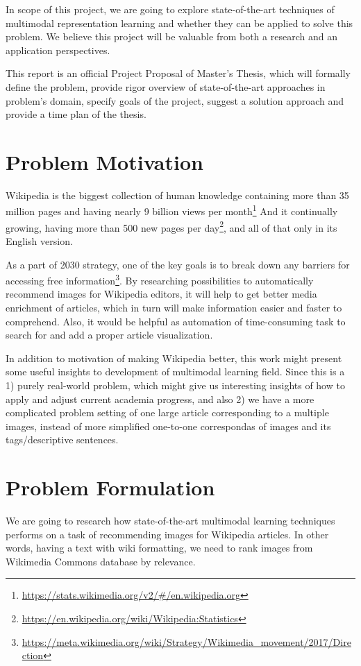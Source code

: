 \documentclass[runningheads]{llncs}
\begin{document}
In scope of this project, we are going to explore state-of-the-art techniques of multimodal representation learning and whether they can be applied to solve this problem. We believe this project will be valuable from both a research and an application perspectives.

This report is an official Project Proposal of Master's Thesis, which will formally define the problem, provide rigor overview of state-of-the-art approaches in problem's domain, specify goals of the project, suggest a solution approach and provide a time plan of the thesis.


\section{Problem Motivation}
Wikipedia is the biggest collection of human knowledge containing more than 35 million pages and having nearly 9 billion views per month\footnote{\url{https://stats.wikimedia.org/v2/#/en.wikipedia.org}} And it continually growing, having more than 500 new pages per day\footnote{\url{https://en.wikipedia.org/wiki/Wikipedia:Statistics}}, and all of that only in its English version.

As a part of 2030 strategy, one of the key goals is to break down any barriers for accessing free information\footnote{\url{https://meta.wikimedia.org/wiki/Strategy/Wikimedia_movement/2017/Direction}}. By researching possibilities to automatically recommend images for Wikipedia editors, it will help to get better media enrichment of articles, which in turn will make information easier and faster to comprehend\cite{ref_image_attention}. Also, it would be helpful as automation of time-consuming task to search for and add a proper article visualization. 

In addition to motivation of making Wikipedia better, this work might present some useful insights to development of multimodal learning field. Since this is a 1) purely real-world problem, which might give us interesting insights of how to apply and adjust current academia progress, and also 2) we have a more complicated problem setting of one large article corresponding to a multiple images, instead of more simplified one-to-one correspondas of images and its tags/descriptive sentences.


\section{Problem Formulation}
We are going to research how state-of-the-art multimodal learning techniques performs on a task of recommending images for Wikipedia articles. In other words, having a text with wiki formatting, we need to rank images from Wikimedia Commons database\cite{ref_wiki_commons} by relevance.
\end{document}
